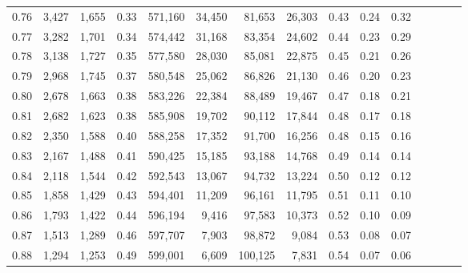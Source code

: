 \begin{tabular}{rrrcrrrrrrrrrrr}
0.76 &   3,427 &  1,655 &                                       0.33 &  571,160 &   34,450 &   81,653 &   26,303 &  0.43 &  0.24 &                         0.32 \\
0.77 &   3,282 &  1,701 &                                       0.34 &  574,442 &   31,168 &   83,354 &   24,602 &  0.44 &  0.23 &                         0.29 \\
0.78 &   3,138 &  1,727 &                                       0.35 &  577,580 &   28,030 &   85,081 &   22,875 &  0.45 &  0.21 &                         0.26 \\
0.79 &   2,968 &  1,745 &                                       0.37 &  580,548 &   25,062 &   86,826 &   21,130 &  0.46 &  0.20 &                         0.23 \\
0.80 &   2,678 &  1,663 &                                       0.38 &  583,226 &   22,384 &   88,489 &   19,467 &  0.47 &  0.18 &                         0.21 \\
0.81 &   2,682 &  1,623 &                                       0.38 &  585,908 &   19,702 &   90,112 &   17,844 &  0.48 &  0.17 &                         0.18 \\
0.82 &   2,350 &  1,588 &                                       0.40 &  588,258 &   17,352 &   91,700 &   16,256 &  0.48 &  0.15 &                         0.16 \\
0.83 &   2,167 &  1,488 &                                       0.41 &  590,425 &   15,185 &   93,188 &   14,768 &  0.49 &  0.14 &                         0.14 \\
0.84 &   2,118 &  1,544 &                                       0.42 &  592,543 &   13,067 &   94,732 &   13,224 &  0.50 &  0.12 &                         0.12 \\
0.85 &   1,858 &  1,429 &                                       0.43 &  594,401 &   11,209 &   96,161 &   11,795 &  0.51 &  0.11 &                         0.10 \\
0.86 &   1,793 &  1,422 &                                       0.44 &  596,194 &    9,416 &   97,583 &   10,373 &  0.52 &  0.10 &                         0.09 \\
0.87 &   1,513 &  1,289 &                                       0.46 &  597,707 &    7,903 &   98,872 &    9,084 &  0.53 &  0.08 &                         0.07 \\
0.88 &   1,294 &  1,253 &                                       0.49 &  599,001 &    6,609 &  100,125 &    7,831 &  0.54 &  0.07 &                         0.06 \\

\end{tabular}
